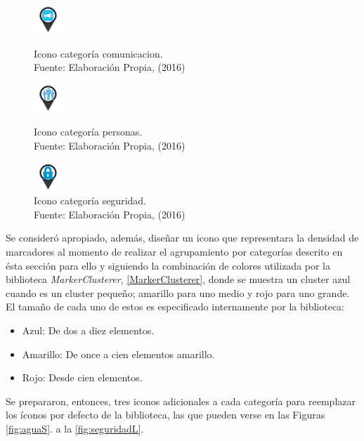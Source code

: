\begin{figure}[!htb]
	\centering
	\captionsetup{justification=centering}
	\includegraphics[scale=1]{images/categorias/comunicacion.png}
	\caption[Icono categoría comunicacion.]{Icono categoría comunicacion.\\Fuente: Elaboración Propia, (2016)}
	\label{fig:comunicacion}	
	\endminipage\hfill
	\centering
	\captionsetup{justification=centering}
	\includegraphics[scale=1]{images/categorias/personas.png}
	\caption[Icono categoría personas.]{Icono categoría personas.\\Fuente: Elaboración Propia, (2016)}
	\label{fig:personas}
	\endminipage\hfill
	\centering
	\captionsetup{justification=centering}
	\includegraphics[scale=1]{images/categorias/seguridad.png}
	\caption[Icono categoría seguridad.]{Icono categoría seguridad.\\Fuente: Elaboración Propia, (2016)}
	\label{fig:seguridad}
	\endminipage\hfill
\end{figure}

Se consideró apropiado, además, diseñar un icono que representara la densidad de marcadores al momento de realizar el agrupamiento por categorías descrito en ésta sección para ello y siguiendo la combinación de colores utilizada por la biblioteca \textit{MarkerClusterer}, \ref{MarkerClusterer}, donde se muestra un cluster azul cuando es un cluster pequeño; amarillo para uno medio y rojo para uno grande. El tamaño de cada uno de estos es especificado internamente por la biblioteca:

\begin{itemize}
\item Azul: De dos a diez elementos.
\item Amarillo: De once a cien elementos amarillo.
\item Rojo: Desde cien elementos.
\end{itemize}

Se prepararon, entonces, tres iconos adicionales a cada categoría para reemplazar los íconos por defecto de la biblioteca, las que pueden verse en las Figuras \ref{fig:aguaS}. a la \ref{fig:seguridadL}.

